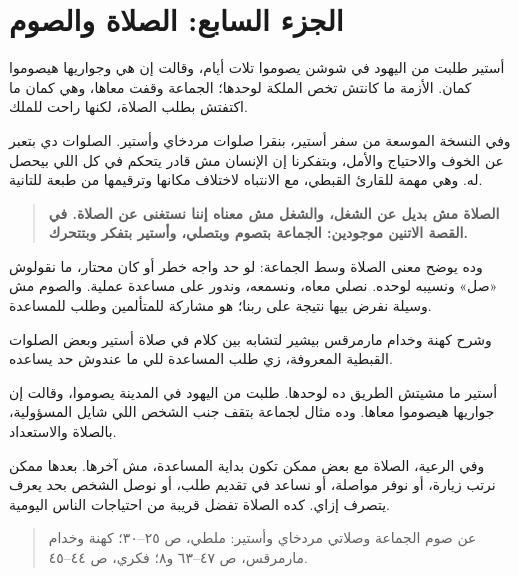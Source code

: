 \documentclass[12pt,a4paper]{article}
\begin{document}
\section*{الجزء السابع: الصلاة والصوم}
أستير طلبت من اليهود في شوشن يصوموا تلات أيام، وقالت إن هي وجواريها هيصوموا كمان. الأزمة ما كانتش تخص الملكة لوحدها؛ الجماعة وقفت معاها، وهي كمان ما اكتفتش بطلب الصلاة، لكنها راحت للملك.\par\medskip
وفي النسخة الموسعة من سفر أستير، بنقرا صلوات مردخاي وأستير. الصلوات دي بتعبر عن الخوف والاحتياج والأمل، وبتفكرنا إن الإنسان مش قادر يتحكم في كل اللي بيحصل له. وهي مهمة للقارئ القبطي، مع الانتباه لاختلاف مكانها وترقيمها من طبعة للتانية.\par\medskip
\begin{quote}\colorbox{soft}{\parbox{0.94\linewidth}{\textbf{الصلاة مش بديل عن الشغل، والشغل مش معناه إننا نستغنى عن الصلاة. في القصة الاتنين موجودين: الجماعة بتصوم وبتصلي، وأستير بتفكر وبتتحرك.}}}\end{quote}
وده يوضح معنى الصلاة وسط الجماعة: لو حد واجه خطر أو كان محتار، ما نقولوش «صل» ونسيبه لوحده. نصلي معاه، ونسمعه، وندور على مساعدة عملية. والصوم مش وسيلة نفرض بيها نتيجة على ربنا؛ هو مشاركة للمتألمين وطلب للمساعدة.\par\medskip
وشرح كهنة وخدام مارمرقس بيشير لتشابه بين كلام في صلاة أستير وبعض الصلوات القبطية المعروفة، زي طلب المساعدة للي ما عندوش حد يساعده.\par\medskip
أستير ما مشيتش الطريق ده لوحدها. طلبت من اليهود في المدينة يصوموا، وقالت إن جواريها هيصوموا معاها. وده مثال لجماعة بتقف جنب الشخص اللي شايل المسؤولية، بالصلاة والاستعداد.\par\medskip
وفي الرعية، الصلاة مع بعض ممكن تكون بداية المساعدة، مش آخرها. بعدها ممكن نرتب زيارة، أو نوفر مواصلة، أو نساعد في تقديم طلب، أو نوصل الشخص بحد يعرف يتصرف إزاي. كده الصلاة تفضل قريبة من احتياجات الناس اليومية.\par\medskip
\begin{quote}\small\color{muted}عن صوم الجماعة وصلاتي مردخاي وأستير: ملطي، ص ٢٥–٣٠؛ كهنة وخدام مارمرقس، ص ٤٧–٦٣ و٨؛ فكري، ص ٤٤–٤٥.\end{quote}
\clearpage
\clearpage
\end{document}
